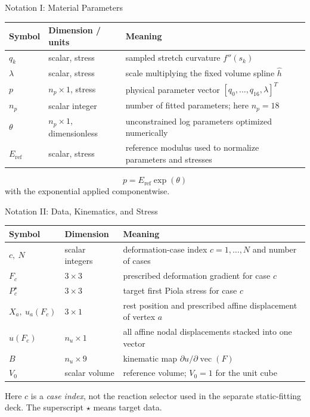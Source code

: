 \documentclass[aspectratio=169,10pt]{beamer}
\newcommand{\vect}[1]{\operatorname{vec}\!\left(#1\right)}
\newcommand{\eref}{E_{\mathrm{ref}}}
\begin{document}
\begin{frame}{Notation I: Material Parameters}
  \small
  \begin{table}
    \centering
    \begin{tabular}{lll}
      \toprule
      Symbol & Dimension / units & Meaning \\
      \midrule
      $q_k$ & scalar, stress &
      sampled stretch curvature $f''(s_k)$ \\
      $\lambda$ & scalar, stress &
      scale multiplying the fixed volume spline $\widehat h$ \\
      $p$ & $n_p\times1$, stress &
      physical parameter vector $[q_0,\ldots,q_{16},\lambda]^T$ \\
      $n_p$ & scalar integer &
      number of fitted parameters; here $n_p=18$ \\
      $\theta$ & $n_p\times1$, dimensionless &
      unconstrained log parameters optimized numerically \\
      $\eref$ & scalar, stress &
      reference modulus used to normalize parameters and stresses \\
      \bottomrule
    \end{tabular}
  \end{table}

  \[
    \boxed{
      p=\eref\exp(\theta)
    }
  \]
  with the exponential applied componentwise.
\end{frame}

\begin{frame}{Notation II: Data, Kinematics, and Stress}
  \small
  \begin{table}
    \centering
    \begin{tabular}{lll}
      \toprule
      Symbol & Dimension & Meaning \\
      \midrule
      $c,\ N$ & scalar integers &
      deformation-case index $c=1,\ldots,N$ and number of cases \\
      $F_c$ & $3\times3$ &
      prescribed deformation gradient for case $c$ \\
      $P_c^\star$ & $3\times3$ &
      target first Piola stress for case $c$ \\
      $X_a,\ u_a(F_c)$ & $3\times1$ &
      rest position and prescribed affine displacement of vertex $a$ \\
      $u(F_c)$ & $n_u\times1$ &
      all affine nodal displacements stacked into one vector \\
      $B$ & $n_u\times9$ &
      kinematic map $\partial u/\partial\vect F$ \\
      $V_0$ & scalar volume &
      reference volume; $V_0=1$ for the unit cube \\
      \bottomrule
    \end{tabular}
  \end{table}

  Here $c$ is a \emph{case index}, not the reaction selector used in the
  separate static-fitting deck. The superscript $\star$ means target data.
\end{frame}
\end{document}
